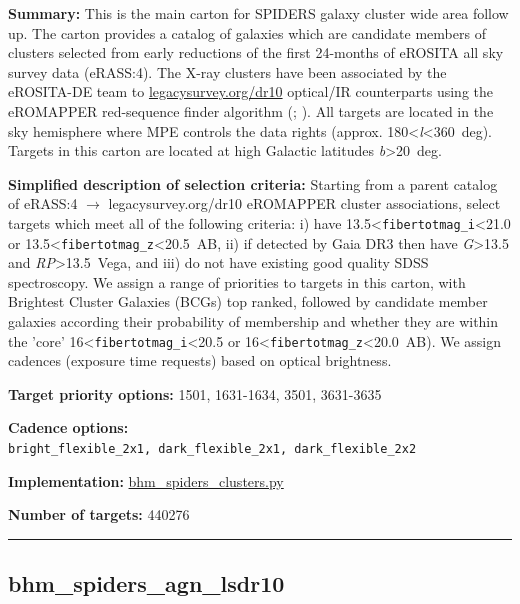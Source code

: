 \noindent\textbf{Summary:} This is the main carton for SPIDERS galaxy cluster
wide area follow up. The carton provides a catalog of galaxies which are
candidate members of clusters selected from early reductions of the
first 24-months of eROSITA all sky survey data (eRASS:4). The X-ray
clusters have been associated by the eROSITA-DE team to
\href{https://www.legacysurvey.org/dr10/}{legacysurvey.org/dr10}
optical/IR counterparts using the eROMAPPER red-sequence finder
algorithm
(\citealt{Rykoff2014};
\citealt{IderChitham2020}). All targets are located in the sky hemisphere
where MPE controls the data rights (approx.
180\textless{}\emph{l}\textless360~deg). Targets in this carton are
located at high Galactic latitudes
\textbar{}\emph{b}\textbar\textgreater20~deg.

\noindent\textbf{Simplified description of selection criteria:} Starting from a
parent catalog of eRASS:4 $\rightarrow$ legacysurvey.org/dr10 eROMAPPER cluster
associations, select targets which meet all of the following criteria:
i) have 13.5\textless{}\texttt{fibertotmag\_i}\textless21.0 or
13.5\textless{}\texttt{fibertotmag\_z}\textless20.5~AB, ii) if detected
by Gaia DR3 then have \emph{G}\textgreater13.5 and
\emph{RP}\textgreater13.5~Vega, and iii) do not have existing good
quality SDSS spectroscopy. We assign a range of priorities to targets in
this carton, with Brightest Cluster Galaxies (BCGs) top ranked, followed
by candidate member galaxies according their probability of membership
and whether they are within the 'core'
16\textless{}\texttt{fibertotmag\_i}\textless20.5 or
16\textless{}\texttt{fibertotmag\_z}\textless20.0~AB). We assign
cadences (exposure time requests) based on optical brightness.


\noindent\textbf{Target priority options:} 1501, 1631-1634, 3501, 3631-3635

\noindent\textbf{Cadence options:}
\texttt{bright\_flexible\_2x1,\ dark\_flexible\_2x1,\ dark\_flexible\_2x2}

\noindent\textbf{Implementation:}
\href{https://github.com/sdss/target_selection/blob/1.0.37/python/target_selection/cartons/bhm_spiders_clusters.py}{bhm\_spiders\_clusters.py}

\noindent\textbf{Number of targets:} 440276

\begin{center}\rule{0.5\linewidth}{0.5pt}\end{center}

\hypertarget{bhm_spiders_agn_lsdr10_plan1.0.37}{%
\subsection{bhm\_spiders\_agn\_lsdr10}\label{bhm_spiders_agn_lsdr10_plan1.0.37}}

